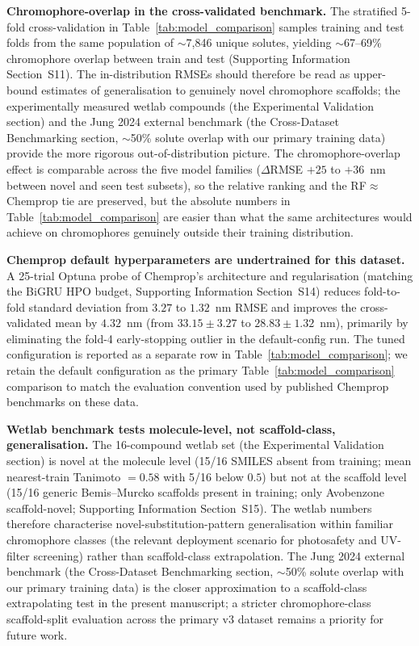 \documentclass[journal=jcisd8,manuscript=article]{achemso}
\begin{document}
\textbf{Chromophore-overlap in the cross-validated benchmark.} The stratified 5-fold cross-validation in Table~\ref{tab:model_comparison} samples training and test folds from the same population of $\sim$7{,}846 unique solutes, yielding $\sim$67--69\% chromophore overlap between train and test (Supporting Information Section~S11). The in-distribution RMSEs should therefore be read as upper-bound estimates of generalisation to genuinely novel chromophore scaffolds; the experimentally measured wetlab compounds (the Experimental Validation section) and the Jung 2024 external benchmark (the Cross-Dataset Benchmarking section, $\sim$50\% solute overlap with our primary training data) provide the more rigorous out-of-distribution picture. The chromophore-overlap effect is comparable across the five model families ($\Delta$RMSE $+25$ to $+36$~nm between novel and seen test subsets), so the relative ranking and the RF$\approx$Chemprop tie are preserved, but the absolute numbers in Table~\ref{tab:model_comparison} are easier than what the same architectures would achieve on chromophores genuinely outside their training distribution.

\textbf{Chemprop default hyperparameters are undertrained for this dataset.} A 25-trial Optuna probe of Chemprop's architecture and regularisation (matching the BiGRU HPO budget, Supporting Information Section~S14) reduces fold-to-fold standard deviation from $3.27$ to $1.32$~nm RMSE and improves the cross-validated mean by $4.32$~nm (from $33.15 \pm 3.27$ to $28.83 \pm 1.32$~nm), primarily by eliminating the fold-4 early-stopping outlier in the default-config run. The tuned configuration is reported as a separate row in Table~\ref{tab:model_comparison}; we retain the default configuration as the primary Table~\ref{tab:model_comparison} comparison to match the evaluation convention used by published Chemprop benchmarks on these data.

\textbf{Wetlab benchmark tests molecule-level, not scaffold-class, generalisation.} The 16-compound wetlab set (the Experimental Validation section) is novel at the molecule level (15/16 SMILES absent from training; mean nearest-train Tanimoto $= 0.58$ with 5/16 below $0.5$) but not at the scaffold level (15/16 generic Bemis--Murcko scaffolds present in training; only Avobenzone scaffold-novel; Supporting Information Section~S15). The wetlab numbers therefore characterise novel-substitution-pattern generalisation within familiar chromophore classes (the relevant deployment scenario for photosafety and UV-filter screening) rather than scaffold-class extrapolation. The Jung 2024 external benchmark (the Cross-Dataset Benchmarking section, $\sim$50\% solute overlap with our primary training data) is the closer approximation to a scaffold-class extrapolating test in the present manuscript; a stricter chromophore-class scaffold-split evaluation across the primary v3 dataset remains a priority for future work.
\end{document}
